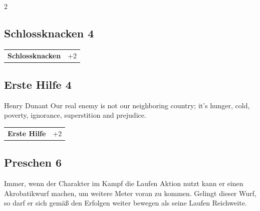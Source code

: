 \begin{multicols}{2}
\begin{tcolorbox}
    \subsection*{Schlossknacken \hfill \small{4 }}
    \tcblower




\begin{tabular}{@{}ll@{}}
    \textbf{Schlossknacken} & +2\\
\end{tabular}


\end{tcolorbox}

\begin{tcolorbox}
    \subsection*{Erste Hilfe \hfill \small{4 }}
    \tcblower


\begin{pquote}{Henry Dunant}
Our real enemy is not our neighboring country; it's hunger, cold, poverty, ignorance, superstition and prejudice.
\end{pquote}

\vspace{3mm}

\begin{tabular}{@{}ll@{}}
    \textbf{Erste Hilfe} & +2\\
\end{tabular}


\end{tcolorbox}

\begin{tcolorbox}
    \subsection*{Preschen \hfill \small{6 }}
    \tcblower
Immer, wenn der Charakter im Kampf die Laufen Aktion nutzt kann er einen Akrobatikwurf machen, um weitere Meter voran zu kommen. Gelingt dieser Wurf, so darf er sich gemäß den Erfolgen weiter bewegen als seine Laufen Reichweite. 


\end{tcolorbox}
\end{multicols}
